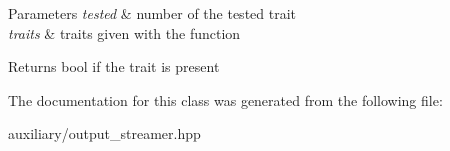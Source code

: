 \begin{DoxyParams}{\-Parameters}
{\em tested} & number of the tested trait \\
\hline
{\em traits} & traits given with the function\\
\hline
\end{DoxyParams}
\begin{DoxyReturn}{\-Returns}
bool if the trait is present 
\end{DoxyReturn}


\-The documentation for this class was generated from the following file\-:\begin{DoxyCompactItemize}
\item 
auxiliary/output\-\_\-streamer.\-hpp\end{DoxyCompactItemize}
